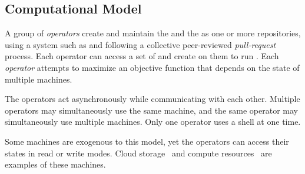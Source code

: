 \subsection{Computational Model}\label{computation_model}\label{operator}\label{operators}

A group of \emph{operators} create and maintain the  and the  as one or more repositories, using a system such as  and following a collective peer-reviewed \emph{pull-request}~\cite{pull_request} process. Each operator can access a set of  and create  on them to run . Each \emph{operator} attempts to maximize an objective function that depends on the state of multiple machines.

The operators act asynchronously while communicating with each other. Multiple operators may simultaneously use the same machine, and the same operator may simultaneously use multiple machines. Only one operator uses a shell at one time. 

Some machines are exogenous to this model, yet the operators can access their states in read or write modes. Cloud storage~\cite{aws_s3} and compute resources~\cite{aws_batch} are examples of these machines.
